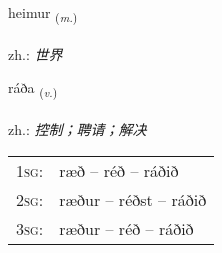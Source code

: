 \documentclass[frontgrid, backgrid]{flacards}\usepackage[]{graphicx}\usepackage[]{xcolor}
\begin{document}
\renewcommand{\flhead}{\vskip5pt \fboxsep=0pt {\small\bfseries\footnotesize Nafnorð | 名词}}
\renewcommand{\fcfoot}{\vskip5pt \fboxsep=0pt \hspace{2pt}{\small\bfseries\footnotesize 1K}}

\renewcommand{\blhead}{\vskip5pt {\small\bfseries\footnotesize Nafnorð | 名词 }}
\renewcommand{\bcfoot}{\vskip5pt \hspace{2pt}{\small\bfseries\footnotesize 1K}}


{heimur \small{\textsubscript{(\textit{m.})}} \\[1ex] %
\textphonetic{[heiːmʏr]} \\
zh.: \emph{世界} \\  [2ex]
\renewcommand*{\arraystretch}{0.8}
}

\renewcommand{\flhead}{\vskip5pt \fboxsep=0pt {\small\bfseries\footnotesize Sagnorð | 动词}}
\renewcommand{\fcfoot}{\vskip5pt \fboxsep=0pt \hspace{2pt}{\small\bfseries\footnotesize 1K}}

\renewcommand{\blhead}{\vskip5pt {\small\bfseries\footnotesize Sagnorð | 动词 }}
\renewcommand{\bcfoot}{\vskip5pt \hspace{2pt}{\small\bfseries\footnotesize 1K}}


{ráða \small{\textsubscript{(\textit{v.})}} \\[1ex] %
\textphonetic{[rauːða]} \\
zh.: \emph{控制；聘请；解决} \\  [2ex]
\renewcommand*{\arraystretch}{0.8}
\begin{tabular}{p{1cm}l}
\textsc{1sg}: & ræð -- réð -- ráðið \\ 
\textsc{2sg}: & ræður -- réðst -- ráðið \\ 
\textsc{3sg}: & ræður -- réð -- ráðið \\ 
\end{tabular}
}
\end{document}
